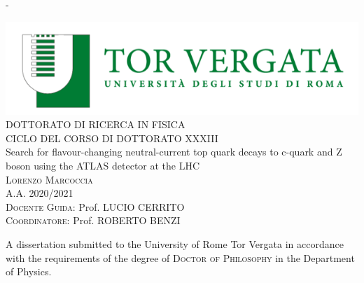 
\begin{adjustwidth*}{\unitlength}{-\unitlength}
	\begin{center}
		\includegraphics[scale=1]{frontmatter/figures/uniroma2}\\
		\vspace{1cm}
		{\large\textsc{DOTTORATO DI RICERCA IN FISICA}}\\
		\vspace{0.8cm}
		{\large\textsc{CICLO DEL CORSO DI DOTTORATO XXXIII}}\\
		\vspace{1cm}
		{\LARGE{Search for flavour-changing neutral-current top quark decays to c-quark and Z boson using the ATLAS detector at the LHC}}\\
		\vspace{6.5mm}
		{\large\textsc{Lorenzo Marcoccia}}\\
		\vspace{1cm}
		{\large\textsc{A.A. 2020/2021}}\\
		\vspace{10mm}
		{\large{\textsc{Docente Guida:}  Prof. LUCIO CERRITO}}\\ 
		\vspace{5mm}
		{\large{\textsc{Coordinatore:   }  Prof. ROBERTO BENZI}}\\ 
		\vspace{3mm}
		\begin{minipage}{10cm}
			\vspace{1cm}
			A dissertation submitted to the University of Rome Tor Vergata  in accordance with the requirements of the degree of \textsc{Doctor of Philosophy} in the Department of Physics.
		\end{minipage}\\
		\vspace{9mm}
		{\large\textsc{}}
		\vspace{12mm}
	\end{center}
\end{adjustwidth*}
\newpage